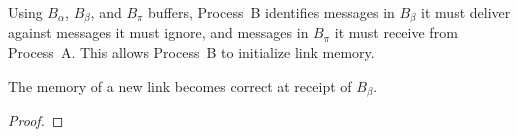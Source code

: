 Using $B_\alpha$, $B_\beta$, and $B_\pi$ buffers, Process~B identifies messages
in $B_\beta$ it must deliver against messages it must ignore, and messages in
$B_\pi$ it must receive from Process~A. This allows Process~B to initialize link
memory.

\begin{theorem}
  The memory of a new link becomes correct at receipt of $B_\beta$.
\end{theorem}

\begin{proof}
\end{proof}







